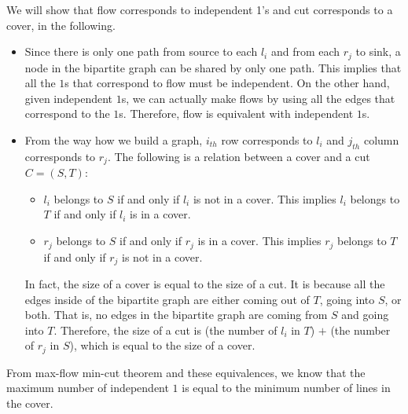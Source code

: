 \documentclass[11pt]{article}
\begin{document}
\begin{enumerate}
    We will show that flow corresponds to independent 1's and cut
    corresponds to a cover, in the following.
    \begin{itemize}
        \item Since there is only one path from source to
        each $l_i$ and from each $r_j$ to sink, a node in
        the bipartite graph can be shared by only one path.
        This implies that all the $1$s that correspond to
        flow must be independent. On the other hand, given
        independent $1$s, we can actually make flows by
        using all the edges that correspond to the $1$s.
        Therefore, flow is equivalent with independent $1$s.
        \item From the way how we build a graph, $i_{th}$ row
        corresponds to $l_i$ and $j_{th}$ column corresponds to
        $r_j$. The following is a relation between a cover and
        a cut $C=(S,T)$:
        \begin{itemize}
            \item $l_i$ belongs to $S$ if and only if $l_i$
            is not in a cover. This implies $l_i$ belongs to
            $T$ if and only if $l_i$ is in a cover.
            \item $r_j$ belongs to $S$ if and only if $r_j$
            is in a cover. This implies $r_j$ belongs to $T$
            if and only if $r_j$ is not in a cover.
        \end{itemize}
        In fact, the size of a cover is equal to the size of
        a cut. It is because all the edges inside of the
        bipartite graph are either coming out of $T$, going
        into $S$, or both. That is, no edges in the
        bipartite graph are coming from $S$ and going into
        $T$. Therefore, the size of a cut is (the number of
        $l_i$ in $T$) $+$ (the number of $r_j$ in $S$),
        which is equal to the size of a cover.
    \end{itemize}
    From max-flow min-cut theorem and these equivalences, we know
    that the maximum number of independent $1$ is equal to the
    minimum number of lines in the cover.
    
\end{enumerate} 
\end{document}
